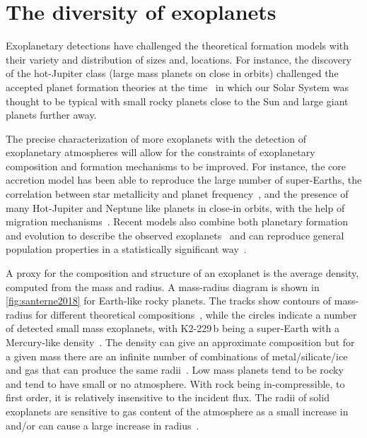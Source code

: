 
\section{The diversity of exoplanets}
\label{sec:exoplanet_diversity}
Exoplanetary detections have challenged the theoretical formation models with their variety and distribution of sizes and, locations.
For instance, the discovery of the hot-Jupiter class (large mass planets on close in orbits) challenged the accepted planet formation theories at the time~\citep[.e.g][]{pollack_formation_1996, boss_giant_1997} in which our Solar System was thought to be typical with small rocky planets close to the Sun and large giant planets further away.

The precise characterization of more exoplanets with the detection of exoplanetary atmospheres will allow for the constraints of exoplanetary composition and formation mechanisms to be improved.
For instance, the core accretion model has been able to reproduce the large number of super-Earths, the correlation between star metallicity and planet frequency~\citep[e.g.][]{santos_spectroscopic_2004, fischer_planetmetallicity_2005}, and the presence of many Hot-Jupiter and Neptune like planets in close-in orbits, with the help of migration mechanisms~\citep[e.g.][]{triaud_exoplanets_2016}.
Recent models also combine both planetary formation and evolution to describe the observed exoplanets~\citep[e.g.][]{mordasini_characterization_2012} and can reproduce general population properties in a statistically significant way~\citep{mordasini_extrasolar_2009}.

A proxy for the composition and structure of an exoplanet is the average density, computed from the mass and radius.
A mass-radius diagram is shown in \cref{fig:santerne2018} for Earth-like rocky planets.
The tracks show contours of mass-radius for different theoretical compositions~\citep{brugger_constraints_2017}, while the circles indicate a number of detected small mass exoplanets, with {K2-229\,b} being a super-Earth with a Mercury-like density~\citep{santerne_earthsized_2018}.
The density can give an approximate composition but for a given mass there are an infinite number of combinations of metal/silicate/ice and gas that can produce the same radii~\citep[e.g.][]{seager_massradius_2007}.
Low mass planets tend to be rocky and tend to have small or no atmosphere.
With rock being in-compressible, to first order, it is relatively insensitive to the incident flux.
The radii of solid exoplanets are sensitive to gas content of the atmosphere as a small increase in  and/or  can cause a large increase in radius~\citep{adams_ocean_2008}.

